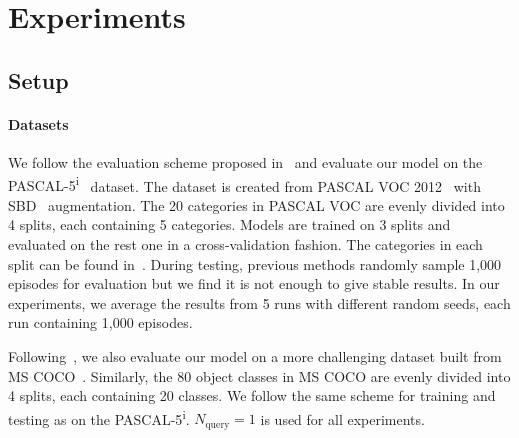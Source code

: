 \documentclass[10pt,twocolumn,letterpaper]{article}
\begin{document}
\section{Experiments}

\subsection{Setup}
 
 \paragraph{Datasets} We follow the evaluation scheme proposed in~\cite{shaban2017one} and evaluate our model on the  {PASCAL-5\textsuperscript{i}}~\cite{shaban2017one} dataset. The dataset is created from PASCAL VOC 2012~\cite{everingham2010pascal} with SBD~\cite{hariharan2011semantic} augmentation. The 20 categories in PASCAL VOC are evenly divided into 4 splits, each containing 5 categories.  Models are trained on 3 splits and evaluated on the rest one in a cross-validation fashion. The categories in each split can be found in~\cite{shaban2017one}. During testing, previous methods randomly sample 1,000 episodes for evaluation but we find it is not enough to give stable results. In our experiments, we average the results from 5 runs with different random seeds, each run containing 1,000 episodes.
 
 Following~\cite{Hu2018AttentionbasedMG}, we also evaluate our model on a more challenging dataset built from MS COCO~\cite{lin2014microsoft}. Similarly, the 80 object classes in MS COCO are evenly divided into 4 splits, each containing 20 classes. We follow the same scheme for training and testing as on the PASCAL-5\textsuperscript{i}. $N_{\text{query}}=1$ is used for all experiments.
\end{document}
